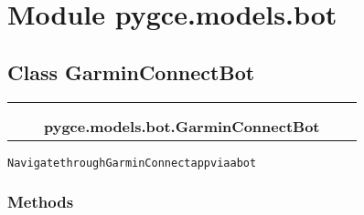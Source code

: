 %
%
%


\section{Module pygce.models.bot}

    \label{pygce:models:bot}


\subsection{Class GarminConnectBot}

    \label{pygce:models:bot:GarminConnectBot}
\begin{tabular}{cccccc}
\multicolumn{2}{r}{\settowidth{\BCL}{object}\multirow{2}{\BCL}{object}}
&&
  \\\cline{3-3}
  &&\multicolumn{1}{c|}{}
&&
  \\
&&\multicolumn{2}{l}{\textbf{pygce.models.bot.GarminConnectBot}}
\end{tabular}

\begin{alltt}
Navigate through Garmin Connect app via a bot 
\end{alltt}



  \subsubsection{Methods}

